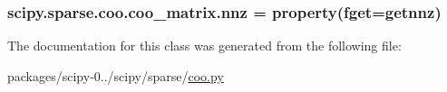 \subsubsection[{nnz}]{\setlength{\rightskip}{0pt plus 5cm}scipy.\+sparse.\+coo.\+coo\+\_\+matrix.\+nnz = property(fget={\bf getnnz})\hspace{0.3cm}{\ttfamily [static]}}\label{classscipy_1_1sparse_1_1coo_1_1coo__matrix_aace3cd7c791be094a00dd37cf3620124}


The documentation for this class was generated from the following file\+:\begin{DoxyCompactItemize}
\item 
packages/scipy-\/0../scipy/sparse/\hyperlink{coo_8py}{coo.\+py}\end{DoxyCompactItemize}
